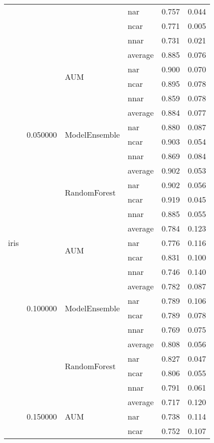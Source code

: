 \begin{longtable}{llllrr}
 &  &  & nar & 0.757 & 0.044 \\
 &  &  & ncar & 0.771 & 0.005 \\
 &  &  & nnar & 0.731 & 0.021 \\
\cline{1-6} \cline{2-6} \cline{3-6}
\multirow[t]{120}{*}{iris} & \multirow[t]{12}{*}{0.050000} & \multirow[t]{4}{*}{AUM} & average & 0.885 & 0.076 \\
 &  &  & nar & 0.900 & 0.070 \\
 &  &  & ncar & 0.895 & 0.078 \\
 &  &  & nnar & 0.859 & 0.078 \\
\cline{3-6}
 &  & \multirow[t]{4}{*}{ModelEnsemble} & average & 0.884 & 0.077 \\
 &  &  & nar & 0.880 & 0.087 \\
 &  &  & ncar & 0.903 & 0.054 \\
 &  &  & nnar & 0.869 & 0.084 \\
\cline{3-6}
 &  & \multirow[t]{4}{*}{RandomForest} & average & 0.902 & 0.053 \\
 &  &  & nar & 0.902 & 0.056 \\
 &  &  & ncar & 0.919 & 0.045 \\
 &  &  & nnar & 0.885 & 0.055 \\
\cline{2-6} \cline{3-6}
 & \multirow[t]{12}{*}{0.100000} & \multirow[t]{4}{*}{AUM} & average & 0.784 & 0.123 \\
 &  &  & nar & 0.776 & 0.116 \\
 &  &  & ncar & 0.831 & 0.100 \\
 &  &  & nnar & 0.746 & 0.140 \\
\cline{3-6}
 &  & \multirow[t]{4}{*}{ModelEnsemble} & average & 0.782 & 0.087 \\
 &  &  & nar & 0.789 & 0.106 \\
 &  &  & ncar & 0.789 & 0.078 \\
 &  &  & nnar & 0.769 & 0.075 \\
\cline{3-6}
 &  & \multirow[t]{4}{*}{RandomForest} & average & 0.808 & 0.056 \\
 &  &  & nar & 0.827 & 0.047 \\
 &  &  & ncar & 0.806 & 0.055 \\
 &  &  & nnar & 0.791 & 0.061 \\
\cline{2-6} \cline{3-6}
 & \multirow[t]{12}{*}{0.150000} & \multirow[t]{4}{*}{AUM} & average & 0.717 & 0.120 \\
 &  &  & nar & 0.738 & 0.114 \\
 &  &  & ncar & 0.752 & 0.107 \\

\end{longtable}
